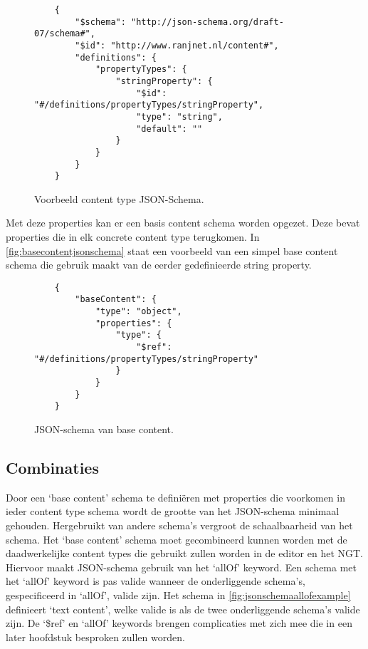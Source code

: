 \begin{figure}[H]
    \centering
    \lstset{language=JSON}
    \begin{lstlisting}
    {
        "$schema": "http://json-schema.org/draft-07/schema#",
        "$id": "http://www.ranjnet.nl/content#",
        "definitions": {
            "propertyTypes": {
                "stringProperty": {
                    "$id": "#/definitions/propertyTypes/stringProperty",
                    "type": "string",
                    "default": ""
                }
            }
        }
    }                            
    \end{lstlisting}
    \caption{Voorbeeld content type JSON-Schema.}
    \label{fig:contenttypejsonschemaexample}
\end{figure}

\noindent Met deze properties kan er een basis content schema worden opgezet. Deze bevat properties die in elk concrete content type terugkomen. In \autoref{fig:basecontentjsonschema} staat een voorbeeld van een simpel base content schema die gebruik maakt van de eerder gedefinieerde string property.

\begin{figure}[htb]
    \centering
    \lstset{language=JSON}
    \begin{lstlisting}
    {
        "baseContent": {
            "type": "object",
            "properties": {
                "type": {
                    "$ref": "#/definitions/propertyTypes/stringProperty"
                }
            }
        }
    }               
    \end{lstlisting}
    \caption{JSON-schema van base content.}
    \label{fig:basecontentjsonschema}
\end{figure}

\subsection{Combinaties}
Door een ‘base content’ schema te definiëren met properties die voorkomen in ieder content type schema wordt de grootte van het JSON-schema minimaal gehouden. Hergebruikt van andere schema’s vergroot de schaalbaarheid van het schema.
Het ‘base content’ schema moet gecombineerd kunnen worden met de daadwerkelijke content types die gebruikt zullen worden in de editor en het NGT. Hiervoor maakt JSON-schema gebruik van het ‘allOf’ keyword. Een schema met het ‘allOf’ keyword is pas valide wanneer de onderliggende schema’s, gespecificeerd in ‘allOf’, valide zijn\cite{Droettboom2016}. Het schema in \autoref{fig:jsonschemaallofexample} definieert ‘text content’, welke valide is als de twee onderliggende schema’s valide zijn.
De ‘\$ref’ en ‘allOf’ keywords brengen complicaties met zich mee die in een later hoofdstuk besproken zullen worden.

